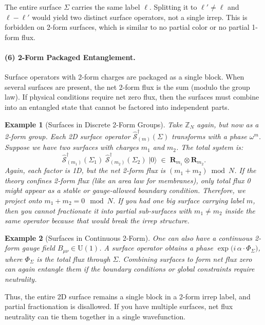 \documentclass[12pt,a4paper]{article}
\newtheorem{example}{Example}
\begin{document}
The entire surface $\Sigma$ carries the same label $\ell$.
Splitting it to $\ell'\neq \ell$ and $\ell-\ell'$ would yield two distinct surface operators, not a single irrep.
This is forbidden on 2-form surfaces, which is similar to no partial color or no partial 1-form flux.


\paragraph{(6) 2-Form Packaged Entanglement.}
Surface operators with 2-form charges are packaged as a single block.
When several surfaces are present, the net 2-form flux is the sum (modulo the group law).
If physical conditions require net zero flux, then the surfaces must combine into an entangled state that cannot be factored into independent parts.


\begin{example}[Surfaces in Discrete 2-Form Groups]
	Take $\mathbb{Z}_N$ again, but now as a 2-form group.
	Each 2D surface operator $\hat{\mathcal{S}}^\dagger_{(m)}(\Sigma)$ transforms with a phase $\omega^m$.
	Suppose we have two surfaces with charges $m_1$ and $m_2$.
	The total system is:	
	\[
	\hat{\mathcal{S}}^\dagger_{(m_1)}(\Sigma_1)
	\;\hat{\mathcal{S}}^\dagger_{(m_2)}(\Sigma_2)
	\;\lvert 0\rangle
	\;\in\;\mathbf{R}_{m_1}\otimes \mathbf{R}_{m_2}.
	\]	
	Again, each factor is 1D, but the net 2-form flux is $(m_1+m_2)\bmod N$.
	If the theory confines 2-form flux (like an area law for membranes), only total flux 0 might appear as a stable or gauge-allowed boundary condition.
	Therefore, we project onto $m_1+m_2=0\mod N$.
	If you had one big surface carrying label $m$, then you cannot fractionate it into partial sub-surfaces with $m_1\neq m_2$ inside the same operator because that would break the irrep structure.
\end{example}


\begin{example}[Surfaces in Continuous 2-Form]
	One can also have a continuous 2-form gauge field $B_{\mu\nu}\in \mathrm{U}(1)$.
	A surface operator obtains a phase $\exp\bigl(i\,\alpha \cdot \Phi_{\Sigma}\bigr)$, where $\Phi_{\Sigma}$ is the total flux through $\Sigma$.
	Combining surfaces to form net flux zero can again entangle them if the boundary conditions or global constraints require neutrality.
\end{example}


Thus, the entire 2D surface remains a single block in a 2-form irrep label, and partial fractionation is disallowed.
If you have multiple surfaces, net flux neutrality can tie them together in a single wavefunction.
\end{document}
